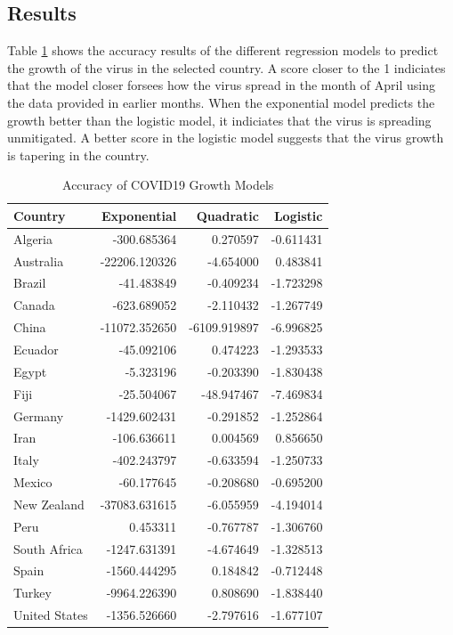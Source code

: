 \documentclass{homework}
\begin{document}
\newpage
\subsection{Results}

Table \ref{Task 1 Results} shows the accuracy results of the different regression models to predict the growth of the virus in the selected country. A score closer to the 1 indiciates that the model closer forsees how the virus spread in the month of April using the data provided in earlier months. When the exponential model predicts the growth better than the logistic model, it indiciates that the virus is spreading unmitigated. A better score in the logistic model suggests that the virus growth is tapering in the country.

\begin{table}[H]
  \caption{Accuracy of COVID19 Growth Models}
  \label{Task 1 Results}
  \centering
  \begin{tabular}{lrrr}
    \toprule
    Country       & Exponential   & Quadratic    & Logistic  \\
    \midrule
    Algeria       & -300.685364   & 0.270597     & -0.611431 \\
    Australia     & -22206.120326 & -4.654000    & 0.483841  \\
    Brazil        & -41.483849    & -0.409234    & -1.723298 \\
    Canada        & -623.689052   & -2.110432    & -1.267749 \\
    China         & -11072.352650 & -6109.919897 & -6.996825 \\
    Ecuador       & -45.092106    & 0.474223     & -1.293533 \\
    Egypt         & -5.323196     & -0.203390    & -1.830438 \\
    Fiji          & -25.504067    & -48.947467   & -7.469834 \\
    Germany       & -1429.602431  & -0.291852    & -1.252864 \\
    Iran          & -106.636611   & 0.004569     & 0.856650  \\
    Italy         & -402.243797   & -0.633594    & -1.250733 \\
    Mexico        & -60.177645    & -0.208680    & -0.695200 \\
    New Zealand   & -37083.631615 & -6.055959    & -4.194014 \\
    Peru          & 0.453311      & -0.767787    & -1.306760 \\
    South Africa  & -1247.631391  & -4.674649    & -1.328513 \\
    Spain         & -1560.444295  & 0.184842     & -0.712448 \\
    Turkey        & -9964.226390  & 0.808690     & -1.838440 \\
    United States & -1356.526660  & -2.797616    & -1.677107 \\
    \bottomrule
  \end{tabular}
\end{table}
\end{document}
